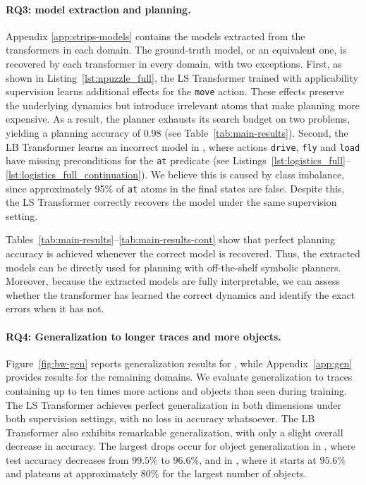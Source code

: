     \paragraph{RQ3: \strips model extraction and planning.}
    Appendix \ref{app:strips-models} contains the \strips models extracted from the transformers in each domain.
    The ground-truth model, or an equivalent one, is recovered by each transformer in every domain, with two exceptions.
    First, as shown in Listing~\ref{lst:npuzzle_full}, the LS Transformer trained with applicability supervision learns additional effects for the \texttt{move} action.
    These effects preserve the underlying dynamics but introduce irrelevant atoms that make planning more expensive.
    As a result, the planner exhausts its search budget on two problems, yielding a planning accuracy of $0.98$ (see Table~\ref{tab:main-results}).
    Second, the LB Transformer learns an incorrect \strips model in \lgt, where actions \texttt{drive}, \texttt{fly} and \texttt{load} have missing preconditions for the \texttt{at} predicate (see Listings~\ref{lst:logistics_full}--\ref{lst:logistics_full_continuation}).
    We believe this is caused by class imbalance, since approximately 95\% of \texttt{at} atoms in the final states are false.
    Despite this, the LS Transformer correctly recovers the model under the same supervision setting.
    
    Tables~\ref{tab:main-results}--\ref{tab:main-results-cont} show that perfect planning accuracy is achieved whenever the correct model is recovered. Thus, the extracted \strips models can be directly used for planning with off-the-shelf symbolic planners. Moreover, because the extracted models are fully interpretable, we can assess whether the transformer has learned the correct dynamics and identify the exact errors when it has not.
    
    \paragraph{RQ4: Generalization to longer traces and more objects.}
    Figure~\ref{fig:bw-gen} reports generalization results for \bw, while Appendix~\ref{app:gen} provides results for the remaining domains.
    We evaluate generalization to traces containing up to ten times more actions and objects than seen during training.
    The LS Transformer achieves perfect generalization in both dimensions under both supervision settings, with no loss in accuracy whatsoever.
    The LB Transformer also exhibits remarkable generalization, with only a slight overall decrease in accuracy.
    The largest drops occur for object generalization in \bw, where test accuracy decreases from $99.5\%$ to $96.6\%$, and in \lgt, where it starts at $95.6\%$ and plateaus at approximately $80\%$ for the largest number of objects.
\fi